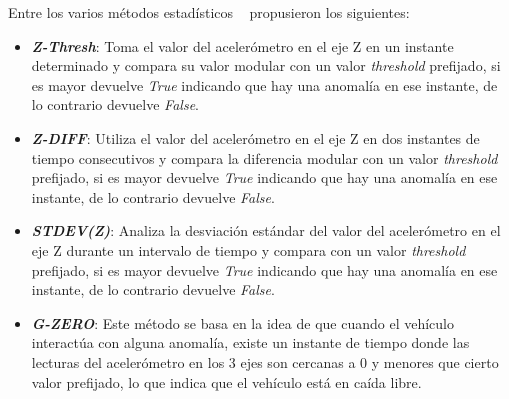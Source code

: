 





Entre los varios métodos estadísticos ~ propusieron los siguientes:\\

\begin{itemize}
	\item  \emph{\textbf {Z-Thresh}}: Toma el valor del acelerómetro en el eje Z en un instante determinado y compara su valor modular con 
	un valor \emph{threshold} prefijado, si es mayor devuelve \emph{True} indicando que hay una anomalía en ese instante, de lo contrario
	devuelve \emph{False}.\\
	\item \emph{\textbf {Z-DIFF}}: Utiliza el valor del acelerómetro en el eje Z en dos instantes de tiempo consecutivos y compara la
		diferencia modular con un valor \emph{threshold} prefijado, si es mayor devuelve \emph{True} indicando que hay una anomalía en ese
		instante, de lo contrario devuelve \emph{False}.\\
	\item \emph{\textbf {STDEV(Z)}}: Analiza la desviación estándar del valor del acelerómetro en el eje Z durante un intervalo de
		tiempo y compara con un valor \emph{threshold} prefijado, si es mayor devuelve \emph{True} indicando que hay una anomalía en ese
		instante, de lo contrario devuelve \emph{False}.\\ 
	\item \emph{\textbf {G-ZERO}}: Este método se basa en la idea de que cuando el vehículo interactúa con alguna anomalía, existe un
		instante de tiempo donde las lecturas del acelerómetro en los 3 ejes son cercanas a 0 y menores que cierto valor prefijado, lo que
		indica que el vehículo está en caída libre.\\
\end{itemize}

